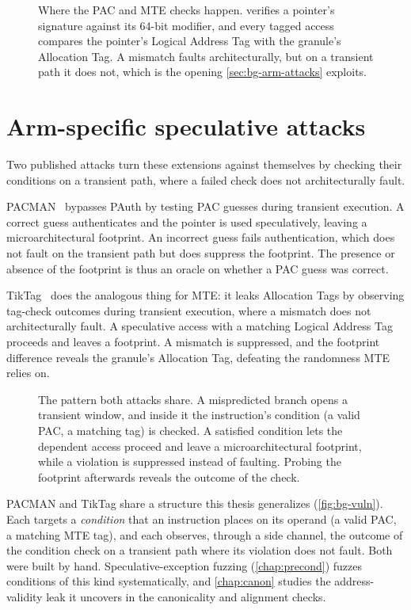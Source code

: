 \begin{figure}[h]
\centering
\fitwidth{}
\caption{Where the PAC and MTE checks happen.  verifies a pointer's signature against its
64-bit modifier, and every tagged access compares the pointer's Logical Address Tag with the granule's Allocation Tag. A mismatch faults architecturally, but on a transient path it does not, which is the
opening \autoref{sec:bg-arm-attacks} exploits.}
\label{fig:bg-pacmte}
\end{figure}

\section{Arm-specific speculative attacks}
\label{sec:bg-arm-attacks}

Two published attacks turn these extensions against themselves by checking their conditions on a
transient path, where a failed check does not architecturally fault.

PACMAN~\cite{pacman} bypasses PAuth by testing PAC guesses during transient execution. A correct
guess authenticates and the pointer is used speculatively, leaving a microarchitectural footprint.
An incorrect guess fails authentication, which does not fault on the transient path but does
suppress the footprint. The presence or absence of the footprint is thus an oracle on whether a PAC
guess was correct.

TikTag~\cite{tiktag} does the analogous thing for MTE: it leaks Allocation Tags by observing
tag-check outcomes during transient execution, where a mismatch does not architecturally fault. A
speculative access with a matching Logical Address Tag proceeds and leaves a footprint. A mismatch is
suppressed, and the footprint difference reveals the granule's Allocation Tag, defeating the
randomness MTE relies on.

\begin{figure}[h]
\centering
\fitwidth{}
\caption{The pattern both attacks share. A mispredicted branch opens a transient
window, and inside it the instruction's condition (a valid PAC, a matching tag) is checked. A
satisfied condition lets the dependent access proceed and leave a microarchitectural footprint,
while a violation is suppressed instead of faulting. Probing the footprint afterwards reveals the
outcome of the check.}
\label{fig:bg-vuln}
\end{figure}

PACMAN and TikTag share a structure this thesis generalizes (\autoref{fig:bg-vuln}). Each targets a \emph{condition}
that an instruction places on its operand (a valid PAC, a matching MTE tag), and each observes,
through a side channel, the outcome of the condition check on a transient path where its
violation does not fault. Both were built by hand. Speculative-exception fuzzing (\autoref{chap:precond}) fuzzes conditions
of this kind systematically, and \autoref{chap:canon} studies the address-validity leak it uncovers
in the canonicality and alignment checks.

